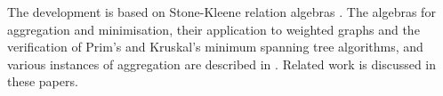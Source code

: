 \documentclass[11pt,a4paper]{article}
\begin{document}
The development is based on Stone-Kleene relation algebras \cite{Guttmann2017b,Guttmann2017c}.
The algebras for aggregation and minimisation, their application to weighted graphs and the verification of Prim's and Kruskal's minimum spanning tree algorithms, and various instances of aggregation are described in \cite{Guttmann2016c,Guttmann2018a,Guttmann2018b}.
Related work is discussed in these papers.

\begin{flushleft}

\end{flushleft}



\end{document}
